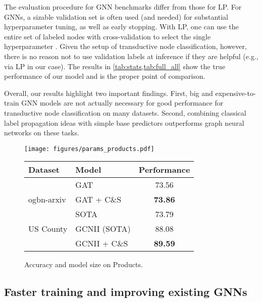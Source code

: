 \documentclass{article}
\newcommand{\framework}{C\&S}
\begin{document}
The evaluation procedure for GNN benchmarks differ from those for LP.
For GNNs, a sizable validation set is often used (and needed) for substantial hyperparameter tuning, as well as early stopping.
With LP, one can use the entire set of labeled nodes  with cross-validation to select the
single hyperparameter .
Given the setup of transductive node classification, however, there is no reason not to use validation labels at inference
if they are helpful (e.g., via LP in our case).
The results in \cref{tab:stats,tab:full_all} show the true performance of our model and is the proper point of comparison.

Overall, our results highlight two important findings.
First, big and expensive-to-train GNN models are not actually necessary for good performance for transductive node classification on many datasets.
Second, combining classical label propagation ideas with simple base predictors outperforms graph neural networks on these tasks.

\begin{figure}[!t]
\centering
\begin{minipage}{.5\linewidth}
        \centering
        \texttt{[image: figures/params\_products.pdf]}
        \label{fig:arxiv_params}
    \caption{\label{fig:parameters} Accuracy and model size on Products.} 
\end{minipage}
\hfill
\begin{minipage}{.48\linewidth}
\centering
{}\label{tab:gnn_correlation}
\vspace{-\baselineskip}
\begin{center}
\begin{tabular}{llc}
\toprule
Dataset &  Model  & Performance \\
\midrule
& GAT  & 73.56 \\
ogbn-arxiv  & GAT + \framework & \textbf{73.86} \\
 & SOTA & 73.79 \\
\midrule
US County & GCNII (SOTA) &  88.08 \\
& GCNII + \framework & \textbf{89.59} \\
\bottomrule
\end{tabular}
\end{center}
\end{minipage}
\end{figure}

\subsection{Faster training and improving existing GNNs}
\label{compute}
\end{document}
